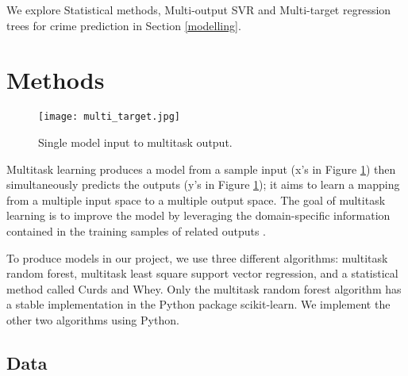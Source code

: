 \documentclass{article}
\begin{document}
We explore Statistical methods, Multi-output SVR and Multi-target regression trees for crime prediction in Section \ref{modelling}.

\section{Methods}
\label{methods}

\begin{figure}[h]
  \centering
  \texttt{[image: multi\_target.jpg]}
  \caption{Single model input to multitask output.}
  \label{multitarget}
\end{figure}

Multitask learning produces a model from a sample input (x’s in Figure \ref{multitarget}) then simultaneously predicts the outputs (y’s in Figure \ref{multitarget}); it aims to learn a mapping from a multiple input space to a multiple output space. The goal of multitask learning is to improve the model by leveraging the domain-specific information contained in the training samples of related outputs \citep{caruana_multitask_1998}.

To produce models in our project, we use three different algorithms: multitask random forest, multitask least square support vector regression, and a statistical method called Curds and Whey. Only the multitask random forest algorithm has a stable implementation in the Python package scikit-learn. We implement the other two algorithms using Python.

\subsection{Data}
\end{document}
